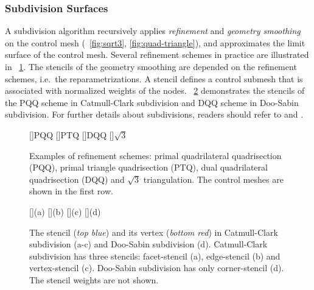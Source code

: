 \documentclass[letter,twocolumn]{article}
\begin{document}
\subsubsection*{Subdivision Surfaces}

A subdivision algorithm recursively 
applies \emph{refinement} and \emph{geometry smoothing} 
on the control mesh (\figurename\ \ref{fig:sqrt3},  
\ref{fig:quad-triangle}), 
and approximates the limit surface of the control mesh.
Several refinement schemes in practice are illustrated in 
\figurename\ \ref{fig:RefSchemes}. The stencils of the
geometry smoothing are depended on the refinement schemes, 
i.e.\ the reparametrizations. A stencil defines a control
submesh that is associated with normalized weights of the 
nodes. \figurename\ \ref{fig:RefMap} 
demonstrates the stencils of the PQQ scheme  
in Catmull-Clark subdivision and DQQ scheme in Doo-Sabin
subdivision. For further details about subdivisions, readers
should refer to \cite{Warren:subdivision} and \cite{Sub:course:2000}.
   
\begin{figure}[tb]
  \centering
  []{\scriptsize PQQ} 
  []{\scriptsize PTQ}
  []{\scriptsize DQQ} 
  []{\scriptsize $\sqrt{3}$} 
  \caption{Examples of refinement schemes: 
    primal quadrilateral quadrisection (PQQ),
    primal triangle quadrisection (PTQ),
    dual quadrilateral quadrisection (DQQ) and
    $\sqrt{3}$ triangulation. The control meshes are shown
    in the first row.}
  \label{fig:RefSchemes}\vspace*{-4mm}
\end{figure}

\begin{figure}[tb]
  \centering
  []{(a)}
  []{(b)}
  []{(c)}
  []{(d)}
  \caption{The stencil ({\itshape top blue}) and its 
           vertex ({\itshape bottom red}) in 
	   Catmull-Clark subdivision (a-c)
           and Doo-Sabin subdivision (d). Catmull-Clark
           subdivision has three stencils: facet-stencil (a), 
           edge-stencil (b) and vertex-stencil (c). 
           Doo-Sabin subdivision has only corner-stencil (d).
	   The stencil weights are not shown.}
  \label{fig:RefMap}\vspace*{-4mm}
\end{figure}
\end{document}
